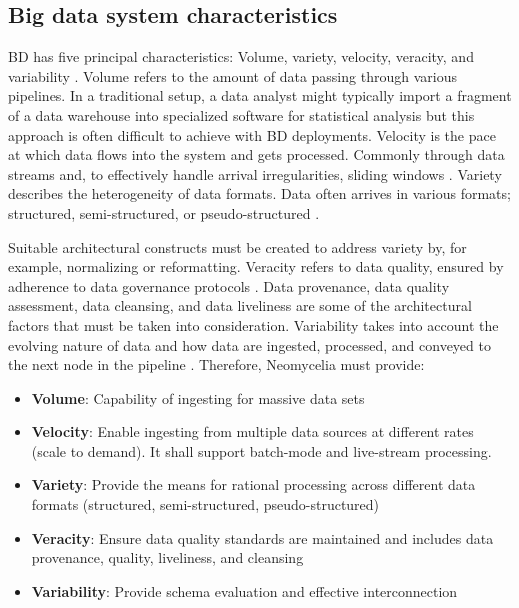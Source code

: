 \documentclass[10pt, conference]{IEEEtran}
\begin{document}
\subsection{Big data system characteristics}

BD has five principal characteristics: Volume, variety, velocity, veracity, and variability \cite{Nadal,AtaeiHype}. Volume refers to the amount of data passing through various pipelines. In a traditional setup, a data analyst might typically import a fragment of a data warehouse into specialized software for statistical analysis \cite{Ordonez} but this approach is often difficult to achieve with BD deployments. Velocity is the pace at which data flows into the system and gets processed. Commonly through data streams and, to effectively handle arrival irregularities, sliding windows \cite{Babcock}. Variety describes the heterogeneity of data formats. Data often arrives in various formats; structured, semi-structured, or pseudo-structured \cite{Terrizzano,AtaeiBigDataEnvirons}.

Suitable architectural constructs must be created to address variety by, for example, normalizing or reformatting. Veracity refers to data quality, ensured by adherence to data governance protocols \cite{Plotkin}. Data provenance, data quality assessment, data cleansing, and data liveliness are some of the architectural factors that must be taken into consideration. Variability takes into account the evolving nature of data and how data are ingested, processed, and conveyed to the next node in the pipeline \cite{Nadal}. Therefore, Neomycelia must provide:

\begin{itemize}
    \item \textbf{Volume}: Capability of ingesting for massive data sets
    \item \textbf{Velocity}: Enable ingesting from multiple data sources at different rates (scale to demand). It shall support batch-mode and live-stream processing.
    \item \textbf{Variety}: Provide the means for rational processing across different data formats (structured, semi-structured, pseudo-structured)
    \item \textbf{Veracity}: Ensure data quality standards are maintained and includes data provenance, quality, liveliness, and cleansing
    \item \textbf{Variability}: Provide schema evaluation and effective interconnection
\end{itemize}
\end{document}
